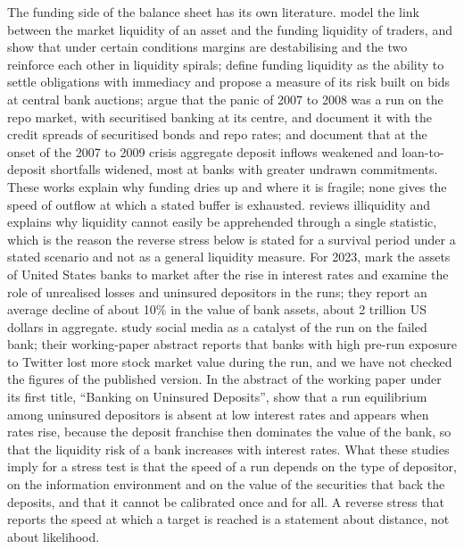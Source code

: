 The funding side of the balance sheet has its own literature. \citet{brunnermeierpedersen2009} model the link between the market liquidity of an asset and the funding liquidity of traders, and show that under certain conditions margins are destabilising and the two reinforce each other in liquidity spirals; \citet{drehmannnikolaou2013} define funding liquidity as the ability to settle obligations with immediacy and propose a measure of its risk built on bids at central bank auctions; \citet{gortonmetrick2012} argue that the panic of 2007 to 2008 was a run on the repo market, with securitised banking at its centre, and document it with the credit spreads of securitised bonds and repo rates; and \citet{acharyamora2015} document that at the onset of the 2007 to 2009 crisis aggregate deposit inflows weakened and loan-to-deposit shortfalls widened, most at banks with greater undrawn commitments. These works explain why funding dries up and where it is fragile; none gives the speed of outflow at which a stated buffer is exhausted. \citet{tirole2011} reviews illiquidity and explains why liquidity cannot easily be apprehended through a single statistic, which is the reason the reverse stress below is stated for a survival period under a stated scenario and not as a general liquidity measure. For 2023, \citet{jiang2024} mark the assets of United States banks to market after the rise in interest rates and examine the role of unrealised losses and uninsured depositors in the runs; they report an average decline of about 10\% in the value of bank assets, about 2 trillion US dollars in aggregate. \citet{cookson2026} study social media as a catalyst of the run on the failed bank; their working-paper abstract reports that banks with high pre-run exposure to Twitter lost more stock market value during the run, and we have not checked the figures of the published version. In the abstract of the working paper under its first title, ``Banking on Uninsured Deposits'',\citet{drechsler2023} show that a run equilibrium among uninsured depositors is absent at low interest rates and appears when rates rise, because the deposit franchise then dominates the value of the bank, so that the liquidity risk of a bank increases with interest rates. What these studies imply for a stress test is that the speed of a run depends on the type of depositor, on the information environment and on the value of the securities that back the deposits, and that it cannot be calibrated once and for all. A reverse stress that reports the speed at which a target is reached is a statement about distance, not about likelihood.

